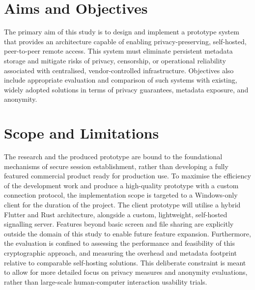 \documentclass[12pt,a4paper,oneside]{report}
\begin{document}
\section{Aims and Objectives}
\label{sec:aims}

The primary aim of this study is to design and implement a prototype system that provides an architecture capable of enabling privacy-preserving, self-hosted, peer-to-peer remote access. This system must eliminate persistent metadata storage and mitigate risks of privacy, censorship, or operational reliability associated with centralised, vendor-controlled infrastructure. Objectives also include appropriate evaluation and comparison of such systems with existing, widely adopted solutions in terms of privacy guarantees, metadata exposure, and anonymity.


\section{Scope and Limitations}
\label{sec:scope}

The research and the produced prototype are bound to the foundational mechanisms of secure session establishment, rather than developing a fully featured commercial product ready for production use. To maximise the efficiency of the development work and produce a high-quality prototype with a custom connection protocol, the implementation scope is targeted to a Windows-only client for the duration of the project. The client prototype will utilise a hybrid Flutter and Rust architecture, alongside a custom, lightweight, self-hosted signalling server. Features beyond basic screen and file sharing are explicitly outside the domain of this study to enable future feature expansion. Furthermore, the evaluation is confined to assessing the performance and feasibility of this cryptographic approach, and measuring the overhead and metadata footprint relative to comparable self-hosting solutions. This deliberate constraint is meant to allow for more detailed focus on privacy measures and anonymity evaluations, rather than large-scale human-computer interaction usability trials.
\end{document}
